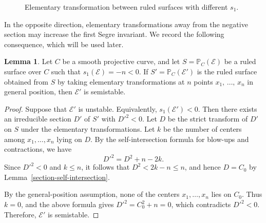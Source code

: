 \documentclass[reqno]{amsart}
\theoremstyle{definition}
\newtheorem{Lemma}[Thm]{Lemma}
\newcommand{\PP}{\mathbb{P}}
\newcommand{\Ee}{\mathcal{E}}
\begin{document}
\begin{center}
\begin{figure}[h]
\vspace{-1em}
\label{elem}
\caption{Elementary transformation between ruled surfaces with different $s_1$.}
\vspace{-2em}
\end{figure}
\end{center}

In the opposite direction, elementary transformations away from the negative section may increase the first Segre invariant.
We record the following consequence, which will be used later.

\begin{Lemma}\label{unstable-to-semistable}
Let $C$ be a smooth projective curve, and let $S=\PP_C(\Ee)$ be a ruled surface over $C$ such that $s_1(\Ee)=-n<0$.
If $S'=\PP_C(\Ee')$ is the ruled surface obtained from $S$ by taking elementary transformations at $n$ points $x_1,\,\ldots,\,x_n$ in general position, then $\Ee'$ is semistable.
\end{Lemma}

\begin{proof}
Suppose that $\Ee'$ is unstable.
Equivalently, $s_1(\Ee')<0$.
Then there exists an irreducible section $D'$ of $S'$ with $D'^2<0$.
Let $D$ be the strict transform of $D'$ on $S$ under the elementary transformations.
Let $k$ be the number of centers among $x_1,\ldots,x_n$ lying on $D$.
By the self-intersection formula for blow-ups and contractions, we have
\[
D'^2=D^2+n-2k.
\]
Since $D'^2<0$ and $k\leq n$, it follows that $D^2<2k-n\leq n$, and hence $D=C_0$ by Lemma~\ref{section-self-intersection}.

By the general-position assumption, none of the centers $x_1,\ldots,x_n$ lies on $C_0$.
Thus $k=0$, and the above formula gives $D'^2=C_0^2+n=0$, which contradicts $D'^2<0$.
Therefore, $\Ee'$ is semistable.
\end{proof}
\end{document}
